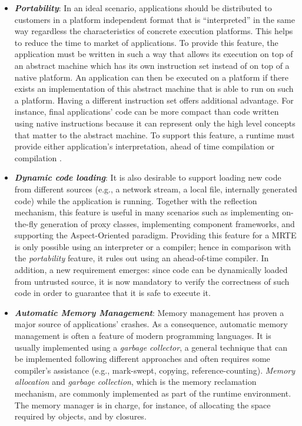 \begin{itemize}
\item \textbf{\textit{Portability}}:
In an ideal scenario, applications should be distributed to customers in a platform independent format that is ``interpreted'' in the same way regardless the characteristics of concrete execution platforms.
This helps to reduce the time to market of applications.
To provide this feature, the application must be written in such a way that allows its execution on top of an abstract machine which has its own instruction set instead of on top of a native platform.
An application can then be executed on a platform if there exists an implementation of this abstract machine that is able to run on such a platform.
Having a different instruction set offers additional advantage.
For instance, final applications' code can be more compact than code written using native instructions because it can represent only the high level concepts that matter to the abstract machine.
To support this feature, a runtime must provide either application's interpretation, ahead of time compilation \cite{Muller:1997:HFE:1268028.1268029,Proebsting:1997:TJA:1268028.1268031,Wang:2011:MAC:2038698.2038704,Oh:2015:BAC:2757012.2757057} or  compilation \cite{Inoue:2012:AMC:2398857.2384630,Paleczny:2001:JHT:1267847.1267848,Grcevski:2004:JTJ:1267242.1267254}.

\item \textbf{\textit{Dynamic code loading}}:
It is also desirable to support loading new code from different sources (e.g., a network stream, a local file, internally generated code) while the application is running.
Together with the reflection mechanism, this feature is useful in many scenarios such as implementing on-the-fly generation of proxy classes, implementing component frameworks, and supporting the Aspect-Oriented paradigm.
Providing this feature for a MRTE is only possible using an interpreter or a  compiler; hence in comparison with the \textit{portability} feature, it rules out using an ahead-of-time compiler.
In addition, a new requirement emerges: since code can be dynamically loaded from untrusted source, it is now mandatory to verify the correctness of such code in order to guarantee that it is safe to execute it.  

\item \textbf{\textit{Automatic Memory Management}}: 
Memory management has proven a major source of applications' crashes.
As a consequence, automatic memory management is often a feature of modern programming languages.
It is usually implemented using a \textit{garbage collector}, a general technique that can be implemented following different approaches and often requires some compiler's assistance (e.g., mark-swept, copying, reference-counting).
\textit{Memory allocation} and \textit{garbage collection}, which is the memory reclamation mechanism, are commonly implemented as part of the runtime environment.
The memory manager is in charge, for instance, of allocating the space required by objects, and by closures.


\end{itemize}
